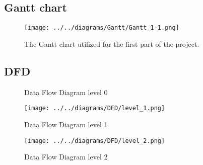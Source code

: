 \vspace*{\fill}
\subsection*{Gantt chart}
\vspace*{\fill}
\pagebreak

\begin{landscape}
    \begin{figure}
        \centering
        \texttt{[image: ../../diagrams/Gantt/Gantt\_1-1.png]}
        \caption{The Gantt chart utilized for the first part of the project.}
    \end{figure}
\end{landscape}
\pagebreak

\vspace*{\fill}
\subsection*{DFD}
\vspace*{\fill}
\pagebreak


\begin{landscape}
    \begin{figure}
        \centering
        
        \caption{Data Flow Diagram level 0}
    \end{figure}
\end{landscape}
\pagebreak


\begin{landscape}
    \begin{figure}
        \centering
        \texttt{[image: ../../diagrams/DFD/level\_1.png]}
        \caption{Data Flow Diagram level 1}
    \end{figure}
\end{landscape}
\pagebreak


\begin{landscape}
    \begin{figure}
        \centering
        \texttt{[image: ../../diagrams/DFD/level\_2.png]}
        \caption{Data Flow Diagram level 2}
    \end{figure}
\end{landscape}
\pagebreak